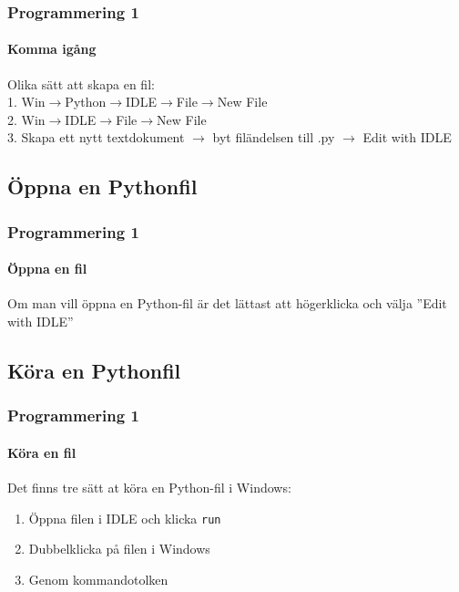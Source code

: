 \documentclass[aspectratio=169]{beamer}
\begin{document}
\begin{frame}

\frametitle{Programmering 1}
\framesubtitle{Komma igång}
Olika sätt att skapa en fil:\\
1. Win$\rightarrow$Python$\rightarrow$IDLE$\rightarrow$File$\rightarrow$New File\\
2. Win$\rightarrow$IDLE$\rightarrow$File$\rightarrow$New File\\
3. Skapa ett nytt textdokument $\rightarrow$ byt filändelsen till .py $\rightarrow$ Edit with IDLE

\end{frame}

\subsection{Öppna en Pythonfil}

\begin{frame}
	\frametitle{Programmering 1}
	\framesubtitle{Öppna en fil}
	
	Om man vill öppna en Python-fil är det lättast att högerklicka och välja ''Edit with IDLE''
	
\end{frame}

\subsection{Köra en Pythonfil}

\begin{frame}
	\frametitle{Programmering 1}
	\framesubtitle{Köra en fil}
	
	Det finns tre sätt at köra en Python-fil i Windows:
	
	\begin{enumerate}
		\item Öppna filen i IDLE och klicka \texttt{run}
		\item Dubbelklicka på filen i Windows
		\item Genom kommandotolken
	\end{enumerate}
	
\end{frame}
\end{document}
